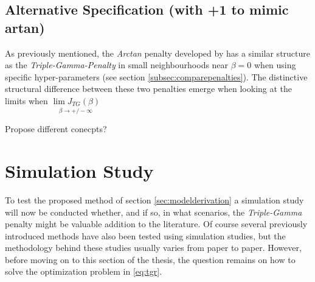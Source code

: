 \documentclass[12pt,a4paper]{article}
\newenvironment{lightbluebox}{%
    \begin{tcolorbox}[colback=lightblue, colframe=lightblue, fontupper=\itshape]%
}{%
    \end{tcolorbox}%
}
\begin{document}


\subsection{Alternative Specification (with +1 to mimic artan)}

As previously mentioned, the \textit{Arctan} penalty developed by \textcite{WangZhu2016} has a similar structure as the \textit{Triple-Gamma-Penalty} in small neighbourhoods near $\beta = 0$ when using specific hyper-parameters (see section \ref{subsec:comparepenalties}). The distinctive structural difference between these two penalties emerge when looking at the limits when  $\underset{\beta \to +/- \infty}{\lim J_{TG}(\beta)}$

\begin{lightbluebox}
Propose different conecpts?
\end{lightbluebox}


\newpage
\section{Simulation Study}
To test the proposed method of section \ref{sec:modelderivation} a simulation study will now be conducted whether, and if so, in what scenarios, the \textit{Triple-Gamma} penalty might be valuable addition to the literature. Of course several previously introduced methods have also been tested using simulation studies, but the methodology behind these studies usually varies from paper to paper. However, before moving on to this section of the thesis, the question remains on how to solve the optimization problem in \ref{eq:tgr}. 
\end{document}
